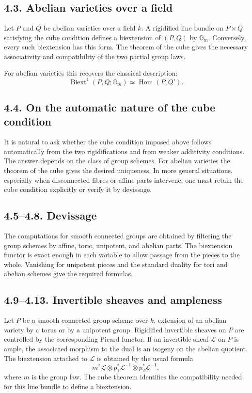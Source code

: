 \documentclass[11pt]{article}
\newcommand{\Gm}{\mathbb G_m}
\newcommand{\Hom}{\operatorname{Hom}}
\newcommand{\Biext}{\operatorname{Biext}}
\begin{document}
\subsection*{4.3. Abelian varieties over a field}

Let \(P\) and \(Q\) be abelian varieties over a field \(k\). A rigidified line
bundle on \(P\times Q\) satisfying the cube condition defines a biextension of
\((P,Q)\) by \(\Gm\). Conversely, every such biextension has this form. The
theorem of the cube gives the necessary associativity and compatibility of the
two partial group laws.

For abelian varieties this recovers the classical description:
\[
\Biext^1(P,Q;\Gm)\simeq \Hom(P,Q').
\]

\subsection*{4.4. On the automatic nature of the cube condition}

It is natural to ask whether the cube condition imposed above follows
automatically from the two rigidifications and from weaker additivity
conditions. The answer depends on the class of group schemes. For abelian
varieties the theorem of the cube gives the desired uniqueness. In more general
situations, especially when disconnected fibres or affine parts intervene, one
must retain the cube condition explicitly or verify it by devissage.

\subsection*{4.5--4.8. Devissage}

The computations for smooth connected groups are obtained by filtering the group
schemes by affine, toric, unipotent, and abelian parts. The biextension functor
is exact enough in each variable to allow passage from the pieces to the whole.
Vanishing for unipotent pieces and the standard duality for tori and abelian
schemes give the required formulas.

\subsection*{4.9--4.13. Invertible sheaves and ampleness}

Let \(P\) be a smooth connected group scheme over \(k\), extension of an abelian
variety by a torus or by a unipotent group. Rigidified invertible sheaves on
\(P\) are controlled by the corresponding Picard functor. If an invertible sheaf
\(\mathcal L\) on \(P\) is ample, the associated morphism to the dual is an
isogeny on the abelian quotient. The biextension attached to \(\mathcal L\) is
obtained by the usual formula
\[
m^*\mathcal L\otimes p_1^*\mathcal L^{-1}\otimes p_2^*\mathcal L^{-1},
\]
where \(m\) is the group law. The cube theorem identifies the compatibility
needed for this line bundle to define a biextension.
\end{document}
